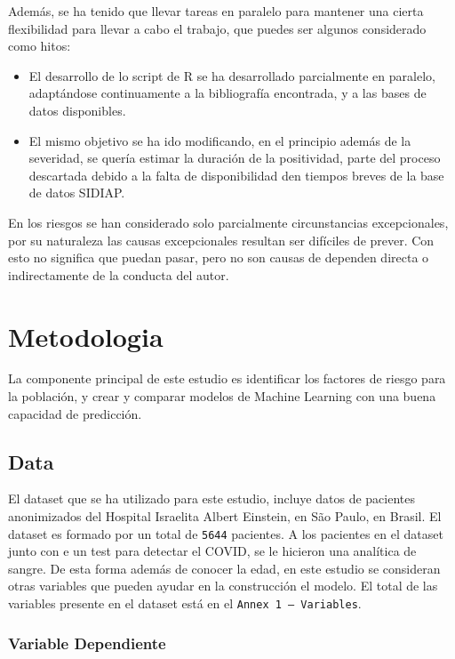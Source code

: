 \documentclass[
]{article}
\begin{document}
Además, se ha tenido que llevar tareas en paralelo para mantener una
cierta flexibilidad para llevar a cabo el trabajo, que puedes ser
algunos considerado como hitos:

\begin{itemize}
\item
  El desarrollo de lo script de R se ha desarrollado parcialmente en
  paralelo, adaptándose continuamente a la bibliografía encontrada, y a
  las bases de datos disponibles.
\item
  El mismo objetivo se ha ido modificando, en el principio además de la
  severidad, se quería estimar la duración de la positividad, parte del
  proceso descartada debido a la falta de disponibilidad den tiempos
  breves de la base de datos SIDIAP.
\end{itemize}

En los riesgos se han considerado solo parcialmente circunstancias
excepcionales, por su naturaleza las causas excepcionales resultan ser
difíciles de prever. Con esto no significa que puedan pasar, pero no son
causas de dependen directa o indirectamente de la conducta del autor.

\pagebreak

\hypertarget{metodologia}{%
\section{Metodologia}\label{metodologia}}

La componente principal de este estudio es identificar los factores de
riesgo para la población, y crear y comparar modelos de Machine Learning
con una buena capacidad de predicción.

\hypertarget{data}{%
\subsection{Data}\label{data}}

El dataset que se ha utilizado para este estudio, incluye datos de
pacientes anonimizados del Hospital Israelita Albert Einstein, en São
Paulo, en Brasil. El dataset es formado por un total de \texttt{5644}
pacientes. A los pacientes en el dataset junto con e un test para
detectar el COVID, se le hicieron una analítica de sangre. De esta forma
además de conocer la edad, en este estudio se consideran otras variables
que pueden ayudar en la construcción el modelo. El total de las
variables presente en el dataset está en el
\texttt{Annex\ 1\ –\ Variables}.

\hypertarget{variable-dependiente}{%
\subsubsection{Variable Dependiente}\label{variable-dependiente}}
\end{document}
